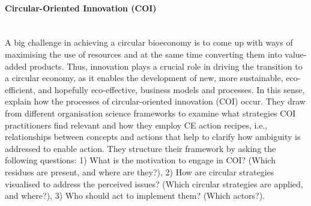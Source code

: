 \paragraph{Circular-Oriented Innovation (COI)} \mbox{}\\

A big challenge in achieving a circular bioeconomy is to come up with ways of maximising the use of resources and at the same time converting them into value-added products. Thus, innovation plays a crucial role in driving the transition to a circular economy, as it enables the development of new, more sustainable, eco-efficient, and hopefully eco-effective, business models and processes. In this sense, \cite{blomsma2022making} explain how the processes of circular-oriented innovation (COI) occur. They draw from different organisation science frameworks to examine what strategies COI practitioners find relevant and how they employ CE action recipes, i.e., relationships between concepts and actions that help to clarify how ambiguity is addressed to enable action. They structure their framework by asking the following questions: 1) What is the motivation to engage in COI? (Which residues are present, and where are they?), 2) How are circular strategies visualised to address the perceived issues? (Which circular strategies are applied, and where?), 3) Who should act to implement them? (Which actors?).


